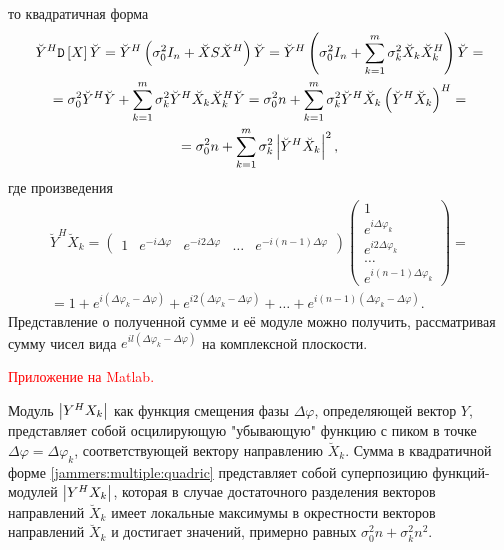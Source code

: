 то квадратичная форма
\begin{multline}
    \label{jammers:multiple:quadric}
    \breve{Y}^H \mathtt{D} \left [ X \right ] \breve{Y}
    = \breve{Y}^H \left ( \sigma_0^2 I_n + \breve{X} S \breve{X}^H \right ) \breve{Y}
    = \breve{Y}^H \left ( \sigma_0^2 I_n + \sum_{k=1}^m \sigma_k^2 \breve{X}_k \breve{X}_k^H \right ) \breve{Y} = \\
    = \sigma_0^2 \breve{Y}^H \breve{Y} + \sum_{k=1}^m \sigma_k^2 \breve{Y}^H \breve{X}_k \breve{X}_k^H \breve{Y}
    = \sigma_0^2 n + \sum_{k=1}^m \sigma_k^2 \breve{Y}^H \breve{X}_k \left ( \breve{Y}^H \breve{X}_k \right )^H = \\
    = \sigma_0^2 n + \sum_{k=1}^m \sigma_k^2 \left | \breve{Y}^H \breve{X}_k \right |^2 ,
\end{multline}
где произведения
\begin{multline*}
    \breve{Y}^H \breve{X}_k
    =
    \begin{pmatrix}
        1                       &
        e^{- i \Delta \varphi}   &
        e^{- i 2 \Delta \varphi} &
        \dots                   &
        e^{- i (n-1) \Delta \varphi}
    \end{pmatrix}
    \begin{pmatrix}
        1                        \\
        e^{i \Delta \varphi_k}   \\
        e^{i 2 \Delta \varphi_k} \\
        \dots                    \\
        e^{i (n-1) \Delta \varphi_k}
    \end{pmatrix}
    = \\
    = 1 + e^{i (\Delta \varphi_k - \Delta \varphi )} + e^{i 2 (\Delta \varphi_k - \Delta \varphi )} + \dots + e^{i (n-1) (\Delta \varphi_k - \Delta \varphi )} .
\end{multline*}
Представление о полученной сумме и её модуле можно получить, рассматривая сумму чисел вида $e^{i l (\Delta \varphi_k - \Delta \varphi )}$ на комплексной
плоскости.

\textcolor{red}{Приложение на Matlab.}

Модуль $\left | Y^H X_k \right |$ как функция смещения фазы $\Delta \varphi$, определяющей вектор $Y$, представляет собой осцилирующую "убывающую"{} функцию с пиком
в точке $\Delta \varphi = \Delta \varphi_k$, соответствующей вектору направлению $\breve{X}_k$. Сумма в квадратичной форме \eqref{jammers:multiple:quadric}
представляет собой суперпозицию функций-модулей $\left | Y^H X_k \right |$, которая в случае достаточного разделения векторов направлений $\breve{X}_k$ имеет локальные
максимумы в окрестности векторов направлений $\breve{X}_k$ и достигает значений, примерно равных $\sigma_0^2 n + \sigma_k^2 n^2$.

